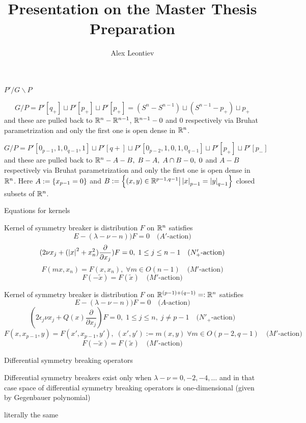 \documentclass[8pt]{beamer}
\title{Presentation on the Master Thesis Preparation}
\subtitle{Alex Leontiev}
\theoremstyle{mystyle}
\begin{document}
\begin{frame}\titlepage\end{frame}
\begin{frame}{$P'/G\backslash P$}
	\begin{theorem}\[G/P=P'[q_+]\sqcup P'[p_+]\sqcup P'[p_+]=
		(S^n-S^{n-1})\sqcup (S^{n-1}-{p_+})\sqcup p_+\]
		and these are pulled back to $\mathbb{R}^n-\mathbb{R}^{n-1}$, $\mathbb{R}^{n-1}-0$ and $0$ respectively via Bruhat parametrization and
		only the first one is open dense in $\mathbb{R}^n$.
\end{theorem}
\begin{theorem}[$O(p,q),\;n:=(p-1)+(q-1)$]
	\[G/P=P'[0_{p-1},1,0_{q-1},1]\sqcup P'[q+]\sqcup P'[0_{p-2},1,0,1,0_{q-1}]\sqcup P'[p_+]\sqcup P'[p_-]\]
	and these are pulled back to $\mathbb{R}^n-A-B,\;B-A,\;A\cap B-{0},\;{0}$ and $A-B$ respectively via Bruhat parametrization and
		only the first one is open dense in $\mathbb{R}^n$.
Here $A:=\left\{x_{p-1}=0\right\}$ and $B:=\left\{(x,y)\in\mathbb{R}^{p-1,q-1}\big| \left|x\right|_{p-1}=\left|y\right|_{q-1}\right\}$ closed subsets of $\mathbb{R}^n$.
\end{theorem}
\end{frame}
\begin{frame}{Equations for kernels}
\begin{theorem}Kernel of symmetry breaker is distribution $F$ on $\mathbb{R}^n$ satisfies
	\[E-(\lambda-\nu-n))F=0\quad\mbox{($A'$-action)}\]
\[(2\nu x_j+(\left|x\right|^2+x_n^2)\frac{\partial}{\partial x_j})F=0,\;1\leq j\leq n-1\quad\mbox{($N_+'$-action)}\]
\[F(mx,x_n)=F(x,x_n),\;\forall m\in O(n-1)\quad\mbox{($M'$-action)}\]
\[F(-\tilde{x})=F(\tilde{x})\quad\mbox{($M'$-action)}\]
\end{theorem}
\begin{theorem}Kernel of symmetry breaker is distribution $F$ on $\mathbb{R}^{(p-1)+(q-1)}=:\mathbb{R}^n$ satisfies
\[E-(\lambda-\nu-n))F=0\quad\mbox{($A$-action)}\]
\[(2\epsilon_j\nu x_j+Q(x)\frac{\partial}{\partial x_j})F=0,\;1\leq j\leq n,\;j\neq p-1\quad\mbox{
($N'_+$-action)}\]
\[F(x,x_{p-1},y)=F(x',x_{p-1},y'),\;(x',y'):=m(x,y)\;\forall m\in O(p-2,q-1)\quad\mbox{($M'$-action)}\]
\[F(-\tilde{x})=F(\tilde{x})\quad\mbox{($M'$-action)}\]
\end{theorem}
\end{frame}
\begin{frame}{Differential symmetry breaking operators}
\begin{theorem}
	Differential symmetry breakers exist only when $\lambda-\nu=0,-2,-4,\hdots$ and in that case space of
	differential symmetry breaking operators is one-dimensional (given by Gegenbauer polynomial)
\end{theorem}
\begin{theorem}[$O(p,q),\;n:=(p-1)+(q-1)$]
	literally the same
\end{theorem}
\end{frame}
\end{document}
